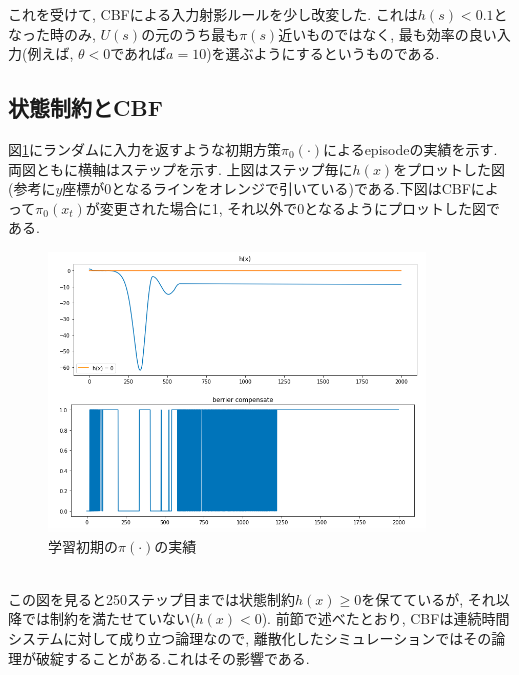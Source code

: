 \documentclass{jsarticle}
\begin{document}
これを受けて, CBFによる入力射影ルールを少し改変した. これは$h(s)<0.1$となった時のみ, $U(s)$の元のうち最も$\pi(s)$近いものではなく, 最も効率の良い入力(例えば, $\theta<0$であれば$a=10$)を選ぶようにするというものである. 




\subsection{状態制約とCBF}
図\ref{init}にランダムに入力を返すような初期方策$\pi_0(\cdot)$によるepisodeの実績を示す. 両図ともに横軸はステップを示す. 上図はステップ毎に$h(x)$をプロットした図(参考に$y$座標が0となるラインをオレンジで引いている)である.下図はCBFによって$\pi_0(x_t)$が変更された場合に1, それ以外で0となるようにプロットした図である.
\begin{figure}[h]
	\centering
 	\includegraphics[width=10cm]{initial_policy.png}
 	\caption{学習初期の$\pi(\cdot)$の実績} \label{init}
\end{figure}\\

この図を見ると250ステップ目までは状態制約$h(x)\geq 0$を保てているが, それ以降では制約を満たせていない($h(x)<0$). 前節で述べたとおり, CBFは連続時間システムに対して成り立つ論理なので, 離散化したシミュレーションではその論理が破綻することがある.これはその影響である. \par
\end{document}
